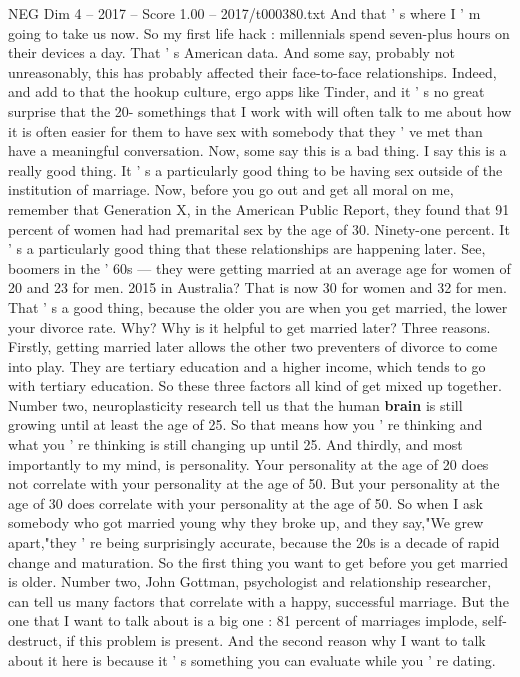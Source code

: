 \begin{textsample}{NEG Dim 4 – 2017 – Score 1.00 – 2017/t000380.txt}
And that ' s where I ' m going to take us now.
So my first life hack : millennials spend seven-plus hours on their devices a day.
That ' s American data.
And some say, probably not unreasonably, this has probably affected their face-to-face relationships.
Indeed, and add to that the hookup culture, ergo apps like Tinder, and it ' s no great surprise that the 20- somethings that I work with will often talk to me about how it is often easier for them to have sex with somebody that they ' ve met than have a meaningful conversation.
Now, some say this is a bad thing.
I say this is a really good thing.
It ' s a particularly good thing to be having sex outside of the institution of marriage.
Now, before you go out and get all moral on me, remember that Generation X, in the American Public Report, they found that 91 percent of women had had premarital sex by the age of 30.
Ninety-one percent.
It ' s a particularly good thing that these relationships are happening later.
See, boomers in the ' 60s — they were getting married at an average age for women of 20 and 23 for men. 2015 in Australia?
That is now 30 for women and 32 for men.
That ' s a good thing, because the older you are when you get married, the lower your divorce rate.
Why?
Why is it helpful to get married later?
Three reasons.
Firstly, getting married later allows the other two preventers of divorce to come into play.
They are tertiary education and a higher income, which tends to go with tertiary education.
So these three factors all kind of get mixed up together.
Number two, neuroplasticity research tell us that the human \textbf{brain} is still growing until at least the age of 25.
So that means how you ' re thinking and what you ' re thinking is still changing up until 25.
And thirdly, and most importantly to my mind, is personality.
Your personality at the age of 20 does not correlate with your personality at the age of 50.
But your personality at the age of 30 does correlate with your personality at the age of 50.
So when I ask somebody who got married young why they broke up, and they say,"We grew apart,"they ' re being surprisingly accurate, because the 20s is a decade of rapid change and maturation.
So the first thing you want to get before you get married is older.
Number two, John Gottman, psychologist and relationship researcher, can tell us many factors that correlate with a happy, successful marriage.
But the one that I want to talk about is a big one : 81 percent of marriages implode, self- destruct, if this problem is present.
And the second reason why I want to talk about it here is because it ' s something you can evaluate while you ' re dating.

\end{textsample}

